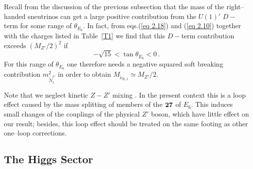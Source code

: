 \documentclass[a4paper,11pt]{article}
\begin{document}
Recall from the discussion of the previous subsection that the mass of
the right--handed sneutrinos can get a large positive contribution
from the $U(1)'$ $D-$term for some range of $\theta_{E_6}$. In fact,
from eqs.(\ref{eq 2.18}) and (\ref{eq 2.10}) together with the charges
listed in Table~\ref{T1} we find that this $D-$term contribution
exceeds $(M_{Z'}/2)^2$ if
%
\begin{equation} \label{th_range}
-\sqrt{15} < \tan \theta_{E_6} < 0\,.
\end{equation}
%
For this range of $\theta_{E_6}$ one therefore needs a negative
squared soft breaking contribution $m^2_{\tilde N^C_1}$ in order to
obtain $M_{\tilde \nu_{R,1}} \simeq M_{Z'}/2$.

Note that we neglect kinetic $Z - Z'$ mixing \cite{Kalinowski:2008iq,
  Belanger:2017vpq}. In the present context this is a loop effect
caused by the mass splitting of members of the ${\bf 27}$ of
$E_6$. This induces small changes of the couplings of the physical
$Z'$ boson, which have little effect on our result; besides, this loop
effect should be treated on the same footing as other one--loop
corrections.

\subsection{The Higgs Sector}
\label{section2.4}
\end{document}
